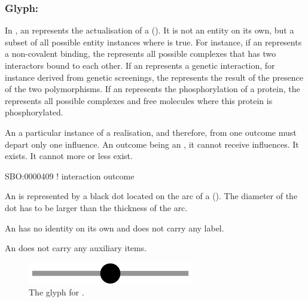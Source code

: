 \subsubsection{Glyph: }\label{sec:outcome}

In \ERs, an  represents the actualisation of a  (). It is not an entity on its own, but a subset of all possible entity instances where   is true. For instance, if an  represents a non-covalent binding, the  represents all possible complexes that has two interactors bound to each other. If an  represents a genetic interaction, for instance derived from genetic screenings, the  represents the result of the presence of the two polymorphisms. If an  represents the phosphorylation of a protein, the  represents all possible complexes and free molecules where this protein is phosphorylated.

An   a particular instance of a realisation, and therefore, from one outcome must depart only one influence. An outcome being an , it cannot receive influences. It exists. It cannot more or less exist. 

\begin{glyphDescription}

\glyphSboTerm SBO:0000409 ! interaction outcome

\glyphContainer  An  is represented by a black dot located on the arc of a  (). The diameter of the dot has to be larger than the thickness of the arc.

\glyphLabel An  has no identity on its own and does not carry any label. 

\glyphAux An  does not carry any auxiliary items.

\end{glyphDescription}

\begin{figure}[H]
  \centering
  \includegraphics[scale = 0.5]{images/outcome}
  \caption{The \ER glyph for .}
  \label{fig:outcome}
\end{figure}


